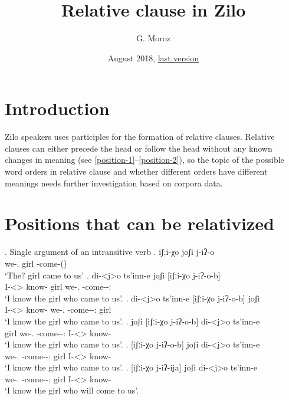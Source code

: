 
\title{\Large Relative clause in Zilo}
\author{G. Moroz}
\date{August 2018, \href{https://github.com/agricolamz/2018_Andi_relative_clause/raw/master/main.pdf}{last version}}
 
\maketitle

\section{Introduction}
Zilo speakers uses participles for the formation of relative clauses. Relative clauses can either precede the head or follow the head without any known changes in meaning (see \ref{position-1}--\ref{position-2}), so the topic of the possible word orders in relative clause and whether different orders have different meanings needs further investigation based on corpora data.

\section{Positions that can be relativized}

\ex. Single argument of an intransitive verb
	\ag. iʃːi-χo joʃi j-iʔ-o\\
		 {we-\Add.\Lat} {girl} {\F-come-\Pst(\Aor)}\\
		 \glt    `The? girl came to us'
	\bg. di-<j>o ts'inn-e joʃi [iʃːi-χo j-iʔ-o-b]\\
		 {I-<\F>\Aff} {know-\Hab} {girl} {we-\Add.\Lat} {\F-come-\Pst-\Ptcp:\Pst}\\
		 \glt    `I know the girl who came to us'. \label{position-1}
	\bg. di-<j>o ts'inn-e [iʃːi-χo j-iʔ-o-b] joʃi \\
		 {I-<\F>\Aff} {know-\Hab} {we-\Add.\Lat} {\F-come-\Pst-\Ptcp:\Pst} {girl}\\
		 \glt    `I know the girl who came to us'.
	\bg. joʃi  [iʃːi-χo j-iʔ-o-b] di-<j>o ts'inn-e \\
		  {girl}  {we-\Add.\Lat} {\F-come-\Pst-\Ptcp:\Pst} {I-<\F>\Aff} {know-\Hab}\\
		 \glt    `I know the girl who came to us'.
	\bg. [iʃːi-χo j-iʔ-o-b] joʃi di-<j>o ts'inn-e \\
		  {we-\Add.\Lat} {\F-come-\Pst-\Ptcp:\Pst} {girl} {I-<\F>\Aff} {know-\Hab}\\
		 \glt    `I know the girl who came to us'. \label{position-2}
	\bg. [iʃːi-χo j-iʔ-ija] joʃi di-<j>o ts'inn-e \\
		  {we-\Add.\Lat} {\F-come-\Pst-\Ptcp:\Prae} {girl} {I-<\F>\Aff} {know-\Hab}\\
		 \glt    `I know the girl who will come to us'. 

